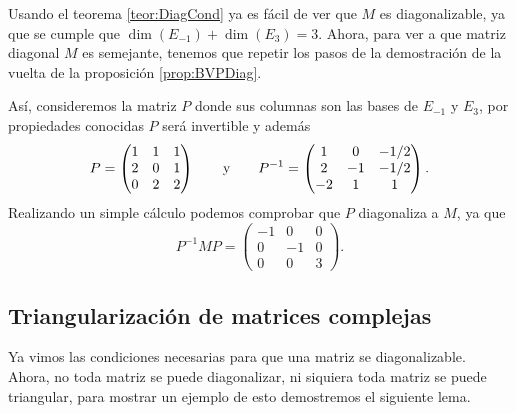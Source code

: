 \begin{example}
  Usando el teorema \ref{teor:DiagCond} ya es fácil de ver que $M$ es diagonalizable, ya que se cumple que $\dim(E_{-1}) + \dim(E_{3}) = 3$. Ahora, para ver a que matriz diagonal $M$  es semejante, tenemos que repetir los pasos de la demostración de la vuelta de la proposición \ref{prop:BVPDiag}.

  Así, consideremos la matriz $P$ donde sus columnas son las bases de $E_{-1}$ y $E_{3}$, por propiedades conocidas $P$ será invertible y además
    \[
      P = \begin{pmatrix}
        1 & 1 & 1 \\
        2 & 0 & 1 \\
        0 & 2 & 2
      \end{pmatrix}
        \qquad\text{y}\qquad
      P^{-1} = \begin{pmatrix} 1 & 0 & -1/2 \\ 2 & -1 & - 1/2 \\ -2 & 1 & 1 \end{pmatrix}.
    \]
  Realizando un simple cálculo podemos comprobar que $P$ diagonaliza a $M$, ya que
    \[
      P^{-1}MP = \begin{pmatrix} -1 & 0 & 0 \\ 0 & -1 & 0 \\ 0 & 0 & 3 \end{pmatrix}.
    \]
\end{example}

\subsection{Triangularización de matrices complejas}

Ya vimos las condiciones necesarias para que una matriz se diagonalizable. Ahora, no toda matriz se puede diagonalizar, ni siquiera toda matriz se puede triangular, para mostrar un ejemplo de esto demostremos el siguiente lema.

